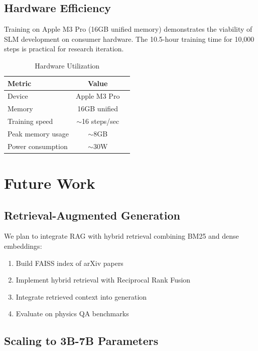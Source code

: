 \documentclass[11pt,a4paper,twocolumn]{article}
\theoremstyle{plain}
\theoremstyle{definition}
\begin{document}
\subsection{Hardware Efficiency}

Training on Apple M3 Pro (16GB unified memory) demonstrates the 
viability of SLM development on consumer hardware. The 10.5-hour 
training time for 10,000 steps is practical for research iteration.

\begin{table}[H]
\centering
\caption{Hardware Utilization}
\begin{tabular}{lcc}
\toprule
\textbf{Metric} & \textbf{Value} \\
\midrule
Device & Apple M3 Pro \\
Memory & 16GB unified \\
Training speed & $\sim$16 steps/sec \\
Peak memory usage & $\sim$8GB \\
Power consumption & $\sim$30W \\
\bottomrule
\end{tabular}
\end{table}

\section{Future Work}

\subsection{Retrieval-Augmented Generation}

We plan to integrate RAG \citep{lewis2020rag} with hybrid retrieval 
combining BM25 and dense embeddings:

\begin{enumerate}[leftmargin=*,itemsep=0pt]
    \item Build FAISS index of arXiv papers
    \item Implement hybrid retrieval with Reciprocal Rank Fusion
    \item Integrate retrieved context into generation
    \item Evaluate on physics QA benchmarks
\end{enumerate}

\subsection{Scaling to 3B-7B Parameters}
\end{document}
